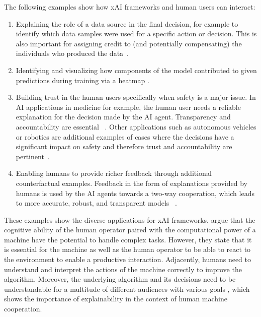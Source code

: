 \documentclass[twoside,11pt]{article}
\begin{document}
The following examples show how xAI frameworks and human users can interact:
\begin{enumerate}
\item Explaining the role of a data source in the final decision, for example to identify which data samples were used for a specific action or decision. This is also important for assigning credit to (and potentially compensating) the individuals who produced the data~\citep{zanzotto2019human}. 
\item Identifying and visualizing how components of the model contributed to given predictions during training via a heatmap \citep{HolzingerMueller:2021:HumanAI}.
\item Building trust in the human users specifically when safety is a major issue. In AI applications in medicine for example, the human user needs a reliable explanation for the decision made by the AI agent. Transparency and accountability are essential ~\citep{Schneeberger:2020:legalAI, Stoeger:2021:MedicalAI}. Other applications such as autonomous vehicles or robotics are additional examples of cases where the decisions have a significant impact on safety and therefore trust and accountability are pertinent~\citep{araiza2019safe, WellsBednarz:2021:xAIRLSurvey}.
\item Enabling humans to provide richer feedback through additional counterfactual examples. Feedback in the form of explanations provided by humans is used by the AI agents towards a two-way cooperation, which leads to more accurate, robust, and transparent models ~\citep{Karalus:2021:HITL-counterfactuals,PuiuttaVeith:2020:xAIRLSurvey}.
\end{enumerate}

These examples show the diverse applications for xAI frameworks. \citet{LiangEtAl:2017:HITLReinforcementLearn} argue that the cognitive ability of the human operator paired with the computational power of a machine have the potential to handle complex tasks. However, they state that it is essential for the machine as well as the human operator to be able to react to the environment to enable a productive interaction. Adjacently, humans need to understand and interpret the actions of the machine correctly to improve the algorithm. Moreover, the underlying algorithm and its decisions need to be understandable for a multitude of different audiences with various goals \citep{heuillet2021explainability}, which shows the importance of explainability in the context of human machine cooperation.
\end{document}
